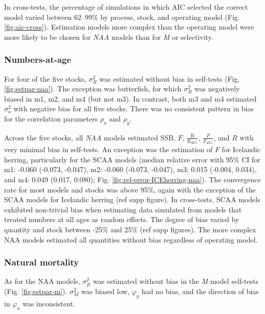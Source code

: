 \documentclass[]{article}
\begin{document}
In cross-tests, the percentage of simulations in which AIC selected the
correct model varied between 62--99\% by process, stock, and operating
model (Fig. \ref{fig:aic-cross}). Estimation models more complex than
the operating model were more likely to be chosen for \emph{NAA} models
than for \emph{M} or selectivity.

\hypertarget{numbers-at-age}{%
\subsubsection{Numbers-at-age}\label{numbers-at-age}}

For four of the five stocks, \(\sigma^2_R\) was estimated without bias
in self-tests (Fig. \ref{fig:estpar-naa}). The exception was butterfish,
for which \(\sigma^2_R\) was negatively biased in m1, m2, and m4 (but
not m3). In contrast, both m3 and m4 estimated \(\sigma^2_a\) with
negative bias for all five stocks. There was no consistent pattern in
bias for the correlation parameters \(\rho_a\) and \(\rho_y\).

Across the five stocks, all \emph{NAA} models estimated SSB, \(F\),
\(\frac{\text{B}}{\text{B}_{40\%}}\), \(\frac{F}{F_{40\%}}\), and \(R\)
with very minimal bias in self-tests. An exception was the estimation of
\(F\) for Icelandic herring, particularly for the SCAA models (median
relative error with 95\% CI for m1: -0.060 (-0.073, -0.047), m2: -0.060
(-0.073, -0.047), m3: 0.015 (-0.004, 0.034), and m4: 0.049 (0.017,
0.080); Fig. \ref{fig:rel-error-ICEherring-naa}). The convergence rate
for most models and stocks was above 95\%, again with the exception of
the SCAA models for Icelandic herring (ref supp figure). In cross-tests,
SCAA models exhibited non-trivial bias when estimating data simulated
from models that treated numbers at all ages as random effects. The
degree of bias varied by quantity and stock between -25\% and 25\% (ref
supp figures). The more complex NAA models estimated all quantities
without bias regardless of operating model.

\hypertarget{natural-mortality}{%
\subsubsection{Natural mortality}\label{natural-mortality}}

As for the NAA models, \(\sigma^2_R\) was estimated without bias in the
\emph{M} model self-tests (Fig. \ref{fig:estpar-m}). \(\sigma^2_M\) was
biased low, \(\varphi_y\) had no bias, and the direction of bias in
\(\varphi_a\) was inconsistent.
\end{document}
